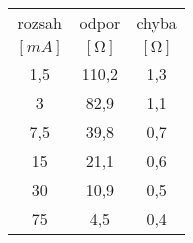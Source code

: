 \begin{tabular}{ccc}                                        \toprule
rozsah      &  odpor           &   chyba                   \\  
$[\si{mA}]$ &  $[\si{\ohm}]$   &   $[\si{\ohm}]$           \\  \midrule
1,5         &  110,2           &   1,3                     \\
3           &  82,9            &   1,1                     \\
7,5         &  39,8            &   0,7                     \\
15          &  21,1            &   0,6                     \\
30          &  10,9            &   0,5                     \\
75          &  4,5             &   0,4                     \\  \bottomrule
\end{tabular}